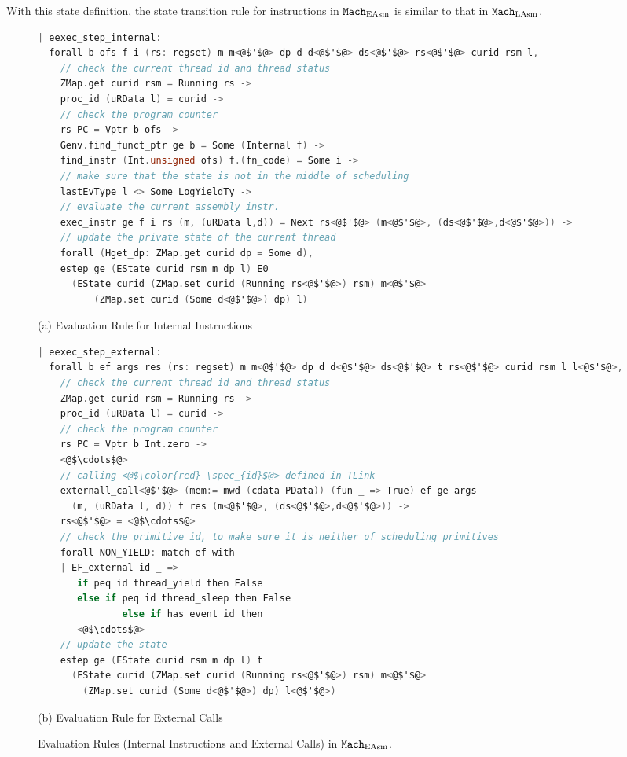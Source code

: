 With this state definition, the state transition rule for instructions in ${\mathrm{\texttt{Mach}}}_{\mathrm{EAsm}}$ is similar to that in ${\mathrm{\texttt{Mach}}}_{\mathrm{LAsm}}$.

\begin{figure}
\begin{lstlisting}[language=C, deletekeywords={unsigned}]
| eexec_step_internal:
  forall b ofs f i (rs: regset) m m<@$'$@> dp d d<@$'$@> ds<@$'$@> rs<@$'$@> curid rsm l,
    // check the current thread id and thread status
    ZMap.get curid rsm = Running rs ->
    proc_id (uRData l) = curid ->
    // check the program counter
    rs PC = Vptr b ofs ->
    Genv.find_funct_ptr ge b = Some (Internal f) ->
    find_instr (Int.unsigned ofs) f.(fn_code) = Some i ->
    // make sure that the state is not in the middle of scheduling
    lastEvType l <> Some LogYieldTy ->
    // evaluate the current assembly instr.
    exec_instr ge f i rs (m, (uRData l,d)) = Next rs<@$'$@> (m<@$'$@>, (ds<@$'$@>,d<@$'$@>)) ->
    // update the private state of the current thread
    forall (Hget_dp: ZMap.get curid dp = Some d),
    estep ge (EState curid rsm m dp l) E0
      (EState curid (ZMap.set curid (Running rs<@$'$@>) rsm) m<@$'$@> 
          (ZMap.set curid (Some d<@$'$@>) dp) l)
\end{lstlisting}
\begin{center}
(a) Evaluation Rule for Internal Instructions
\end{center}
\begin{lstlisting}[language=C]
| eexec_step_external:
  forall b ef args res (rs: regset) m m<@$'$@> dp d d<@$'$@> ds<@$'$@> t rs<@$'$@> curid rsm l l<@$'$@>,
    // check the current thread id and thread status  
    ZMap.get curid rsm = Running rs ->
    proc_id (uRData l) = curid ->
    // check the program counter
    rs PC = Vptr b Int.zero ->
    <@$\cdots$@>
    // calling <@$\color{red} \spec_{id}$@> defined in TLink
    externall_call<@$'$@> (mem:= mwd (cdata PData)) (fun _ => True) ef ge args 
      (m, (uRData l, d)) t res (m<@$'$@>, (ds<@$'$@>,d<@$'$@>)) ->
    rs<@$'$@> = <@$\cdots$@>
    // check the primitive id, to make sure it is neither of scheduling primitives
    forall NON_YIELD: match ef with
    | EF_external id _ => 
       if peq id thread_yield then False
       else if peq id thread_sleep then False
               else if has_event id then
       <@$\cdots$@>
    // update the state
    estep ge (EState curid rsm m dp l) t 
      (EState curid (ZMap.set curid (Running rs<@$'$@>) rsm) m<@$'$@> 
        (ZMap.set curid (Some d<@$'$@>) dp) l<@$'$@>)
\end{lstlisting}
\begin{center}
(b) Evaluation Rule for External Calls
\end{center}
\caption{Evaluation Rules (Internal Instructions and External Calls) in ${\mathrm{\texttt{Mach}}}_{\mathrm{EAsm}}$.}
\label{fig:chapter:linking:eval-rule-in-easm-normal}
\end{figure}



